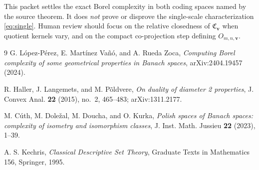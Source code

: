 \documentclass[11pt]{article}
\begin{document}
This packet settles the exact Borel complexity in both coding spaces named by
the source theorem.  It does \emph{not} prove or disprove the single-scale
characterization \eqref{eq:single}.  Human review should focus on the relative
closedness of $\mathfrak C_{\mathbf v}$ when quotient kernels vary, and on the
compact co-projection step defining $O_{m,n,\mathbf v}$.

\begin{thebibliography}{9}
G. L\'opez-P\'erez, E. Mart\'inez Va\~n\'o, and A. Rueda Zoca,
\emph{Computing Borel complexity of some geometrical properties in Banach
spaces}, arXiv:2404.19457 (2024).

R. Haller, J. Langemets, and M. P\~oldvere,
\emph{On duality of diameter 2 properties},
J. Convex Anal. \textbf{22} (2015), no.~2, 465--483;
arXiv:1311.2177.

M. C\'uth, M. Dole\v{z}al, M. Doucha, and O. Kurka,
\emph{Polish spaces of Banach spaces: complexity of isometry and isomorphism
classes}, J. Inst. Math. Jussieu \textbf{22} (2023), 1--39.

A. S. Kechris,
\emph{Classical Descriptive Set Theory},
Graduate Texts in Mathematics 156, Springer, 1995.
\end{thebibliography}
\end{document}
